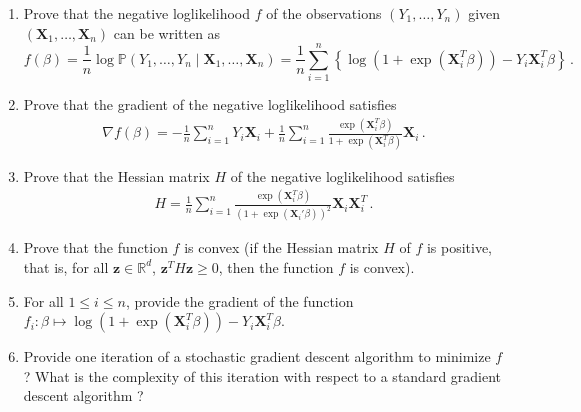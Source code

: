 \documentclass[a4paper,10pt,fleqn]{article}
\newcommand{\eqsp}{\,}
\newcommand{\rset}{\ensuremath{\mathbb{R}}}
\newcommand{\1}{\ensuremath{\mathbbm{1}}}
\newcommand{\bX}{\mathbf{X}}
\newcommand{\bx}{\mathbf{x}}
\newcommand{\bz}{\mathbf{z}}
\begin{document}
\begin{enumerate}
\begin{enumerate}
\item If $\beta = (\beta_0,\beta_1)\in \rset\times \rset^*$, provide the value $\bx_*$ of $\bx_i$ such that $\mathbb{P}(Y_i=1 | \bX_i) = 1/2$. The logistic Bayes classifier is therefore defined by $h_*(\bX_i) = 1$ if and only if $\bx_i>\bx_*$. 
\item Another classifier could be defined by choosing a threshold $\tilde p\in(0,1)$ and defining $\tilde h(\bX_i) = 1$ if and only if $\mathbb{P}(Y_i=1 | \bX_i) > \tilde p$.  Provide $\tilde \bx$ such that $\tilde h(\bX_i) = 1$ if and only if $\bx_i>\tilde x$. Explain a practical interest to choose $\tilde p < 1/2$.
\end{enumerate}
	\item 
	Prove that the negative loglikelihood $f$ of the observations $(Y_1,\ldots,Y_n)$ given $(\bX_1,\ldots,\bX_n)$ can be written as 
	$$
	f(\beta) =   \frac{1}{n}\log \mathbb{P}\left(Y_1,\ldots,Y_n\middle | \bX_1,\ldots,\bX_n\right) = \frac{1}{n}\sum_{i=1}^n \left\{\log(1+\exp(\bX_{i}^T\beta))- Y_{i}\bX_{i}^T\beta\right\}\eqsp.
	$$
	\item Prove that the gradient of the negative loglikelihood satisfies
	\begin{align*}
	\nabla f (\beta) = - \frac{1}{n}\sum_{i=1}^n Y_i \bX_i + \frac{1}{n}\sum_{i=1}^n \frac{\exp(\bX_{i}^T\beta)}{1  + \exp(\bX_{i}^T\beta)} \bX_i\eqsp.
	\end{align*}
	\item Prove that the Hessian matrix $H$ of the negative loglikelihood satisfies
	\begin{align*}
	H = \frac{1}{n}\sum_{i=1}^n \frac{\exp(\bX_{i}^T\beta)}{(1  + \exp(\bX_{i}'\beta))^2} \bX_i\bX_i^T\eqsp.
	\end{align*}
	\item Prove that the function $f$ is convex (if the Hessian matrix $H$ of $f$ is positive, that is, for all $\bz \in \mathbb{R}^d$, $\bz^T H \bz \geqslant 0$, then the function $f$ is convex). 
	\item For all $1\leqslant i \leqslant n$, provide the gradient of the function $f_i: \beta \mapsto \log(1+\exp(\bX_{i}^T\beta))- Y_{i}\bX_{i}^T\beta$.
	
\item Provide one iteration of a stochastic gradient descent algorithm to minimize $f$ ? What is the complexity of this iteration with respect to a standard gradient descent algorithm ?
\end{enumerate}
\end{document}

